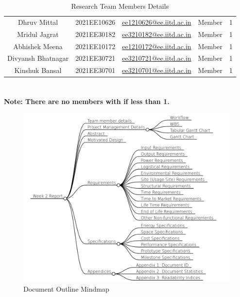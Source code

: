 \documentclass[12pt]{article} %
\begin{document}
\begin{table}[h!]
\begin{tabular}{|c|c|c|c|c|}
Dhruv Mittal & 2021EE10626 & \href{mailto:ee1210626@ee.iitd.ac.in}{ee1210626@ee.iitd.ac.in} & Member & 1 \\
Mridul Jagrat & 2021EE30182 & \href{mailto:ee3210182@ee.iitd.ac.in}{ee3210182@ee.iitd.ac.in} & Member & 1 \\
Abhishek Meena & 2021EE10172 & \href{mailto:ee1210172@ee.iitd.ac.in}{ee1210172@ee.iitd.ac.in} & Member & 1 \\
Divyansh Bhatnagar & 2021EE30721 & \href{mailto:ee3210721@ee.iitd.ac.in}{ee3210721@ee.iitd.ac.in} & Member & 1 \\
Kinshuk Bansal & 2021EE30701 & \href{mailto:ee3210701@ee.iitd.ac.in}{ee3210701@ee.iitd.ac.in} & Member & 1 \\
\hline
\end{tabular}
\caption{Research Team Members Details}
\label{tab:teamDetails}
\end{table}



\newpage

\section*{}
\textbf{Note: There are no members with \acrshort{if} less than 1.}

\newpage
\tableofcontents

\newpage
\listoftables
\listoffigures

\newpage

\begin{figure}
\centering
\includegraphics[scale=0.5]{mindmap}
\caption{Document Outline Mindmap}
    \label{fig:enter-label}
\end{figure}
\end{document}
